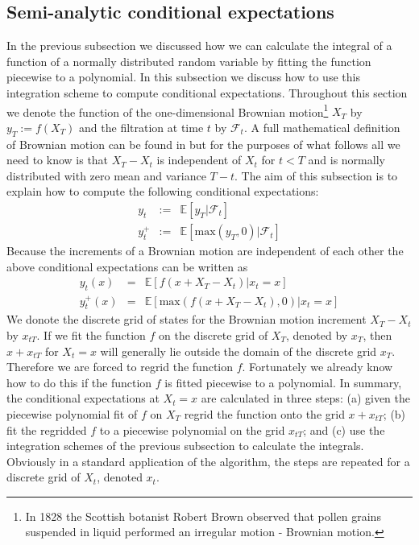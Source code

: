 \subsection{Semi-analytic conditional expectations}
In the previous subsection we discussed how we can calculate the
integral of a function of a normally distributed random variable by
fitting the function piecewise to a polynomial. In this subsection we
discuss how to use this integration scheme to compute conditional
expectations.  Throughout this section we denote the function of the
one-dimensional Brownian motion\footnote{In 1828 the Scottish botanist 
Robert Brown observed that pollen grains suspended in liquid performed 
an irregular motion - Brownian motion.} $X_T$ by $y_T:=f(X_T)$ and the
filtration at time $t$ by $\mathcal F_t$.  A full mathematical definition 
of Brownian motion can be found in \cite{book:OEKSENDAL} but for the purposes 
of what follows all we need to know is that $X_T-X_t$ is independent of $X_t$ for $t < T$ 
and is normally distributed with zero mean and variance $T-t$. The aim of this
subsection is to explain how to compute the following conditional
expectations:
\begin{eqnarray}
y_t &:=& \mathbb E[y_T | \mathcal F_t] \\
y^+_t &:=& \mathbb E[\mbox{max}(y_T, 0) | \mathcal F_t]
\end{eqnarray}
Because the increments of a Brownian motion are independent of each
other the above conditional expectations can be written as
\begin{eqnarray}
y_t(x) &=& \mathbb E[f(x+X_T-X_t) | x_t = x] \\ 
y^+_t(x) &=& \mathbb E[\mbox{max}(f(x+X_T-X_t), 0) | x_t = x]
\end{eqnarray}
We donote the discrete grid of states for the Brownian motion
increment $X_T-X_t$ by $x_{tT}$. If we fit the function $f$ on the
discrete grid of $X_T$, denoted by $x_T$, then $x+x_{tT}$ for $X_t =
x$ will generally lie outside the domain of the discrete grid
$x_T$. Therefore we are forced to regrid the function $f$. Fortunately
we already know how to do this if the function $f$ is fitted piecewise
to a polynomial. In summary, the conditional expectations at $X_t = x$
are calculated in three steps: (a) given the piecewise polynomial fit
of $f$ on $X_T$ regrid the function onto the grid $x+x_{tT}$; (b) fit
the regridded $f$ to a piecewise polynomial on the grid $x_{tT}$; and
(c) use the integration schemes of the previous subsection to
calculate the integrals. Obviously in a standard application of the
algorithm, the steps are repeated for a discrete grid of $X_t$,
denoted $x_t$.

